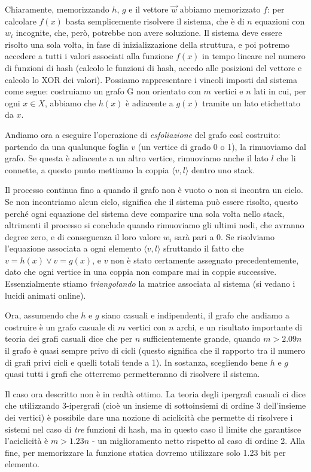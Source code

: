 Chiaramente, memorizzando $h$, $g$ e il vettore $\vec{w}$ abbiamo memorizzato $f$: per calcolare $f(x)$ basta semplicemente risolvere il sistema, che è di $n$ equazioni con $w_i$ incognite, che, però, potrebbe non avere soluzione. Il sistema deve essere risolto una sola volta, in fase di inizializzazione della struttura, e poi potremo accedere a tutti i valori associati alla funzione $f(x)$ in tempo lineare nel numero di funzioni di hash (calcolo le funzioni di hash, accedo alle posizioni del vettore e calcolo lo XOR dei valori). Possiamo rappresentare i vincoli imposti dal sistema come segue: costruiamo un grafo G non orientato con $m$ vertici e $n$ lati in cui, per ogni $x \in X$, abbiamo che $h(x)$ è adiacente a $g(x)$ tramite un lato etichettato da $x$.

Andiamo ora a eseguire l'operazione di \textit{esfoliazione} del grafo così costruito: partendo da una qualunque foglia $v$ (un vertice di grado 0 o 1), la rimuoviamo dal grafo. Se questa è adiacente a un altro vertice, rimuoviamo anche il lato $l$ che li connette, a questo punto mettiamo la coppia $\langle v, l \rangle$ dentro uno stack.

Il processo continua fino a quando il grafo non è vuoto o non si incontra un ciclo. Se non incontriamo alcun ciclo, significa che il sistema può essere risolto, questo perché ogni equazione del sistema deve comparire una sola volta nello stack, altrimenti il processo si conclude quando rimuoviamo gli ultimi nodi, che avranno degree zero, e di conseguenza il loro valore $w_i$ sarà pari a 0. Se risolviamo l'equazione associata a ogni elemento $\langle v, l \rangle$ sfruttando il fatto che $v = h(x) \lor v = g(x)$, e $v$ non è stato certamente assegnato precedentemente, dato che ogni vertice in una coppia non compare mai in coppie successive. Essenzialmente stiamo \textit{triangolando} la matrice associata al sistema (si vedano i lucidi animati online).

Ora, assumendo che $h$ e $g$ siano casuali e indipendenti, il grafo che andiamo a costruire è un grafo casuale di $m$ vertici con $n$ archi, e un risultato importante di teoria dei grafi casuali dice che per $n$ sufficientemente grande, quando $m > 2.09n$ il grafo è quasi sempre privo di cicli (questo significa che il rapporto tra il numero di grafi privi cicli e quelli totali tende a 1). In sostanza, scegliendo bene $h$ e $g$ quasi tutti i grafi che otterremo permetteranno di risolvere il sistema.

Il caso ora descritto non è in realtà ottimo. La teoria degli ipergrafi casuali ci dice che utilizzando 3-ipergrafi (cioè un insieme di sottoinsiemi di ordine 3 dell'insieme dei vertici) è possibile dare una nozione di aciclicità che permette di risolvere i sistemi nel caso di \textit{tre} funzioni di hash, ma in questo caso il limite che garantisce l'aciclicità è $m > 1.23n$ - un miglioramento netto rispetto al caso di ordine 2.
Alla fine, per memorizzare la funzione statica  dovremo utilizzare solo 1.23 bit per elemento.
